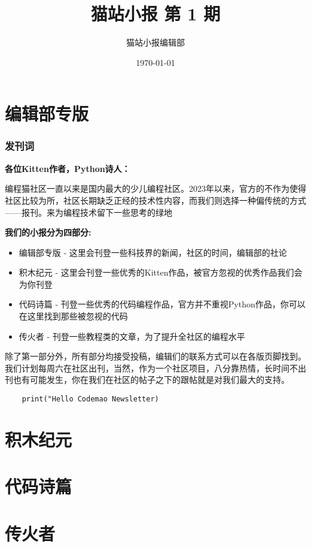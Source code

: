 \documentclass[UTF8,fontset=fandol]{ctexart}
\title{猫站小报 第 1 期}
\author{猫站小报编辑部}
\date{\today}
\begin{document}
\maketitle
\part{编辑部专版}
\section{发刊词}

\noindent
\textbf{各位Kitten作者，Python诗人：} 

编程猫社区一直以来是国内最大的少儿编程社区。2023年以来，官方的不作为使得社区比较为所，社区长期缺乏正经的技术性内容，而我们则选择一种偏传统的方式——报刊。来为编程技术留下一些思考的绿地

\noindent
\textbf{我们的小报分为四部分:}

\begin{itemize}
\item 编辑部专版 - 这里会刊登一些科技界的新闻，社区的时间，编辑部的社论
\item 积木纪元 - 这里会刊登一些优秀的Kitten作品，被官方忽视的优秀作品我们会为你刊登
\item 代码诗篇 - 刊登一些优秀的代码编程作品，官方并不重视Python作品，你可以在这里找到那些被忽视的代码
\item 传火者 - 刊登一些教程类的文章，为了提升全社区的编程水平
\end{itemize}

除了第一部分外，所有部分均接受投稿，编辑们的联系方式可以在各版页脚找到。我们计划每周六在社区出刊，当然，作为一个社区项目，八分靠热情，长时间不出刊也有可能发生，你在我们在社区的帖子之下的跟帖就是对我们最大的支持。

\begin{verbatim}
	print("Hello Codemao Newsletter)
\end{verbatim}

\part{积木纪元}

\part{代码诗篇}

\part{传火者}
\end{document}
